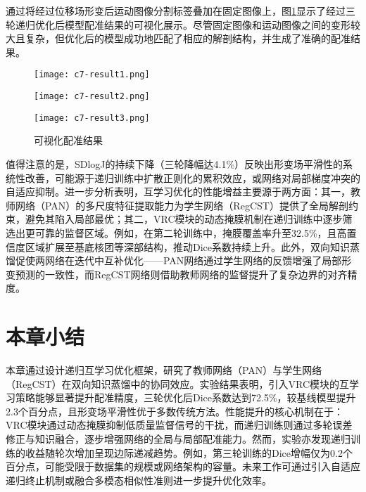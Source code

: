 通过将经过位移场形变后运动图像分割标签叠加在固定图像上，图\ref{fig:7-1}显示了经过三轮递归优化后模型配准结果的可视化展示。尽管固定图像和运动图像之间的变形较大且复杂，但优化后的模型成功地匹配了相应的解剖结构，并生成了准确的配准结果。

\begin{figure}[h]
    \centering
    \begin{minipage}{0.3\textwidth}
        \centering
        \texttt{[image: c7-result1.png]}
    \end{minipage}
    \begin{minipage}{0.3\textwidth}
        \centering
        \texttt{[image: c7-result2.png]}
    \end{minipage}
    \begin{minipage}{0.3\textwidth}
        \centering
        \texttt{[image: c7-result3.png]}
    \end{minipage}
    \caption{可视化配准结果}
    \label{fig:7-1}
\end{figure}

值得注意的是，SDlogJ的持续下降（三轮降幅达4.1\%）反映出形变场平滑性的系统性改善，可能源于递归训练中扩散正则化的累积效应，或网络对局部梯度冲突的自适应抑制。进一步分析表明，互学习优化的性能增益主要源于两方面：其一，教师网络（PAN）的多尺度特征提取能力为学生网络（RegCST）提供了全局解剖约束，避免其陷入局部最优；其二，VRC模块的动态掩膜机制在递归训练中逐步筛选出更可靠的监督区域。例如，在第二轮训练中，掩膜覆盖率升至32.5\%，且高置信度区域扩展至基底核团等深部结构，推动Dice系数持续上升。此外，双向知识蒸馏促使两网络在迭代中互补优化——PAN网络通过学生网络的反馈增强了局部形变预测的一致性，而RegCST网络则借助教师网络的监督提升了复杂边界的对齐精度。

\section{本章小结}

本章通过设计递归互学习优化框架，研究了教师网络（PAN）与学生网络（RegCST）在双向知识蒸馏中的协同效应。实验结果表明，引入VRC模块的互学习策略能够显著提升配准精度，三轮优化后Dice系数达到72.5\%，较基线模型提升2.3个百分点，且形变场平滑性优于多数传统方法。性能提升的核心机制在于：VRC模块通过动态掩膜抑制低质量监督信号的干扰，而递归训练则通过多轮误差修正与知识融合，逐步增强网络的全局与局部配准能力。然而，实验亦发现递归训练的收益随轮次增加呈现边际递减趋势。例如，第三轮训练的Dice增幅仅为0.2个百分点，可能受限于数据集的规模或网络架构的容量。未来工作可通过引入自适应递归终止机制或融合多模态相似性准则进一步提升优化效率。